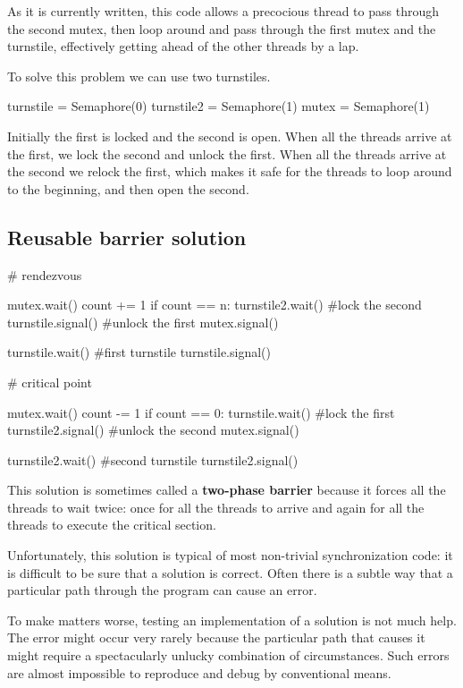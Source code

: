 \documentclass{book}
\begin{document}
As it is currently written, this code
allows a precocious thread to pass through the second mutex,
then loop around and pass through the first mutex and the
turnstile, effectively getting ahead of the other threads by
a lap.

To solve this problem we can use two turnstiles.

\begin{unbreakable}[title={Reusable barrier hint}]{}
turnstile = Semaphore(0)
turnstile2 = Semaphore(1)
mutex = Semaphore(1)
\end{unbreakable}

Initially the first is locked and the second is open.  When all the
threads arrive at the first, we lock the second and unlock the first.
When all the threads arrive at the second we relock the first,
which makes it safe for the threads to loop around to the beginning,
and then open the second.


\subsection {Reusable barrier solution}

\begin{unbreakable}[title={Reusable barrier solution}]{}
# rendezvous

mutex.wait()
  count += 1
  if count == n:
    turnstile2.wait()   #lock the second
    turnstile.signal()  #unlock the first
mutex.signal()

turnstile.wait()        #first turnstile
turnstile.signal()

# critical point

mutex.wait()
  count -= 1
  if count == 0: 
    turnstile.wait()    #lock the first
    turnstile2.signal() #unlock the second
mutex.signal()

turnstile2.wait()       #second turnstile
turnstile2.signal()
\end{unbreakable}

This solution is sometimes called a {\bf two-phase barrier} because
it forces all the threads to wait twice: once for all the threads
to arrive and again for all the threads to execute the critical
section.

Unfortunately, this solution is typical of most non-trivial
synchronization code: it is difficult to be sure that a solution is
correct.  Often there is a subtle way that a particular path through
the program can cause an error.

To make matters worse, testing an implementation of a solution
is not much help.  The error might occur very rarely
because the particular path that causes it might
require a spectacularly unlucky combination of circumstances.
Such errors are almost
impossible to reproduce and debug by conventional means.
\end{document}

